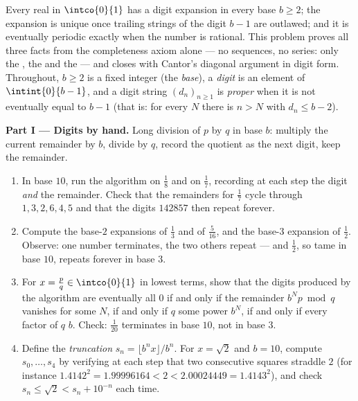 \begin{problem}
\label{pb:b1:reals:1}
Every real in $\intco{0}{1}$ has a digit expansion in every base
$b \geq 2$; the expansion is unique once trailing strings of the
digit $b - 1$ are outlawed; and it is eventually periodic exactly
when the number is rational. This problem proves all three facts
from the completeness axiom alone --- no sequences, no series:
only the , the  and the 
--- and closes with Cantor's diagonal argument in digit form.
Throughout, $b \geq 2$ is a fixed integer (the \emph{base}), a
\emph{digit} is an element of $\intint{0}{b-1}$, and a digit
string $(d_n)_{n \geq 1}$ is \emph{proper} when it is not
eventually equal to $b - 1$ (that is: for every $N$ there is $n >
N$ with $d_n \leq b - 2$).

\medskip
\noindent\textbf{Part I --- Digits by hand.} Long division of $p$
by $q$ in base $b$: multiply the current remainder by $b$, divide
by $q$, record the quotient as the next digit, keep the remainder.
\begin{enumerate}
  \item In base $10$, run the algorithm on $\frac 18$ and on
        $\frac 17$, recording at each step the digit \emph{and}
        the remainder. Check that the remainders for $\frac 17$
        cycle through $1, 3, 2, 6, 4, 5$ and that the digits
        $142857$ then repeat forever.
  \item Compute the base-$2$ expansions of $\frac 13$ and of
        $\frac{5}{16}$, and the base-$3$ expansion of $\frac 12$.
        Observe: one number terminates, the two others repeat ---
        and $\frac 12$, so tame in base $10$, repeats forever in
        base $3$.
  \item For $x = \frac pq \in \intco{0}{1}$ in lowest terms, show
        that the digits produced by the algorithm are eventually
        all $0$ if and only if the remainder $b^N p \bmod q$
        vanishes for some $N$, if and only if $q$  some
        power $b^N$, if and only if every  factor of $q$
         $b$. Check: $\frac{1}{20}$ terminates in base
        $10$, not in base $3$.
  \item Define the \emph{truncation} $s_n = \lfloor b^n x \rfloor
        / b^n$. For $x = \sqrt 2$ and $b = 10$, compute $s_0,
        \dots, s_4$ by verifying at each step that two
        consecutive squares straddle $2$ (for instance $1.4142^2
        = 1.99996164 < 2 < 2.00024449 = 1.4143^2$), and check
        $s_n \leq \sqrt 2 < s_n + 10^{-n}$ each time.
\end{enumerate}


\end{problem}
